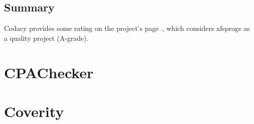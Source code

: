 \subsection{Summary}
Codacy provides some rating on the project's page~\cite{codacyXfsprogs},
which considers xfsprogs as a quality project (A-grade).


\section{CPAChecker}\label{chap:results:cpachecker}

\section{Coverity}\label{chap:results:coverity}

